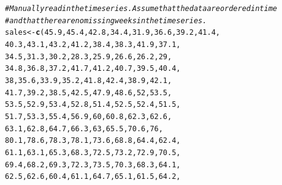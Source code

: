 \documentclass{article}\usepackage[]{graphicx}\usepackage[]{color}
\makeatletter
\newcommand{\hlnum}[1]{\textcolor[rgb]{0.686,0.059,0.569}{#1}}%
\newcommand{\hlcom}[1]{\textcolor[rgb]{0.678,0.584,0.686}{\textit{#1}}}%
\newcommand{\hlstd}[1]{\textcolor[rgb]{0.345,0.345,0.345}{#1}}%
\newcommand{\hlkwb}[1]{\textcolor[rgb]{0.69,0.353,0.396}{#1}}%
\newcommand{\hlkwd}[1]{\textcolor[rgb]{0.737,0.353,0.396}{\textbf{#1}}}%
\newenvironment{kframe}{%
 \def\at@end@of@kframe{}%
 \ifinner\ifhmode%
  \def\at@end@of@kframe{\end{minipage}}%
  \begin{minipage}{\columnwidth}%
 \fi\fi%
 \def\FrameCommand##1{\hskip\@totalleftmargin \hskip-\fboxsep
 \colorbox{shadecolor}{##1}\hskip-\fboxsep
     \hskip-\linewidth \hskip-\@totalleftmargin \hskip\columnwidth}%
 \MakeFramed {\advance\hsize-\width
   \@totalleftmargin\z@ \linewidth\hsize
   \@setminipage}}%
 {\par\unskip\endMakeFramed%
 \at@end@of@kframe}
\newenvironment{knitrout}{}{} %
\makeatother
\begin{document}
\begin{knitrout}
\begin{kframe}
\begin{alltt}
\hlcom{# Manually read in the time series. Assume that the data are ordered in time}
\hlcom{# and that there are no missing weeks in the time series. }
\hlstd{sales} \hlkwb{<-} \hlkwd{c}\hlstd{(}\hlnum{45.9}\hlstd{,}  \hlnum{45.4}\hlstd{,}  \hlnum{42.8}\hlstd{,}  \hlnum{34.4}\hlstd{,} \hlnum{31.9}\hlstd{,}  \hlnum{36.6}\hlstd{,}  \hlnum{39.2}\hlstd{,}  \hlnum{41.4}\hlstd{,}
           \hlnum{40.3}\hlstd{,}  \hlnum{43.1}\hlstd{,}  \hlnum{43.2}\hlstd{,}  \hlnum{41.2}\hlstd{,} \hlnum{38.4}\hlstd{,}  \hlnum{38.3}\hlstd{,}  \hlnum{41.9}\hlstd{,}  \hlnum{37.1}\hlstd{,}
           \hlnum{34.5}\hlstd{,}  \hlnum{31.3}\hlstd{,}  \hlnum{30.2}\hlstd{,}  \hlnum{28.3}\hlstd{,} \hlnum{25.9}\hlstd{,}  \hlnum{26.6}\hlstd{,}  \hlnum{26.2}\hlstd{,}  \hlnum{29}\hlstd{,}
           \hlnum{34.8}\hlstd{,}  \hlnum{36.8}\hlstd{,}  \hlnum{37.2}\hlstd{,}  \hlnum{41.7}\hlstd{,} \hlnum{41.2}\hlstd{,}  \hlnum{40.7}\hlstd{,}  \hlnum{39.5}\hlstd{,}  \hlnum{40.4}\hlstd{,}
           \hlnum{38}\hlstd{,}    \hlnum{35.6}\hlstd{,}  \hlnum{33.9}\hlstd{,}  \hlnum{35.2}\hlstd{,} \hlnum{41.8}\hlstd{,}  \hlnum{42.4}\hlstd{,}  \hlnum{38.9}\hlstd{,}  \hlnum{42.1}\hlstd{,}
           \hlnum{41.7}\hlstd{,}  \hlnum{39.2}\hlstd{,}  \hlnum{38.5}\hlstd{,}  \hlnum{42.5}\hlstd{,} \hlnum{47.9}\hlstd{,}  \hlnum{48.6}\hlstd{,}  \hlnum{52}\hlstd{,}    \hlnum{53.5}\hlstd{,}
           \hlnum{53.5}\hlstd{,}  \hlnum{52.9}\hlstd{,}  \hlnum{53.4}\hlstd{,}  \hlnum{52.8}\hlstd{,} \hlnum{51.4}\hlstd{,}  \hlnum{52.5}\hlstd{,}  \hlnum{52.4}\hlstd{,}  \hlnum{51.5}\hlstd{,}
           \hlnum{51.7}\hlstd{,}  \hlnum{53.3}\hlstd{,}  \hlnum{55.4}\hlstd{,}  \hlnum{56.9}\hlstd{,} \hlnum{60}\hlstd{,}    \hlnum{60.8}\hlstd{,}  \hlnum{62.3}\hlstd{,}  \hlnum{62.6}\hlstd{,}
           \hlnum{63.1}\hlstd{,}  \hlnum{62.8}\hlstd{,}  \hlnum{64.7}\hlstd{,}  \hlnum{66.3}\hlstd{,} \hlnum{63}\hlstd{,}    \hlnum{65.5}\hlstd{,}  \hlnum{70.6}\hlstd{,}  \hlnum{76}\hlstd{,}
           \hlnum{80.1}\hlstd{,}  \hlnum{78.6}\hlstd{,}  \hlnum{78.3}\hlstd{,}  \hlnum{78.1}\hlstd{,} \hlnum{73.6}\hlstd{,}  \hlnum{68.8}\hlstd{,}  \hlnum{64.4}\hlstd{,}  \hlnum{62.4}\hlstd{,}
           \hlnum{61.1}\hlstd{,}  \hlnum{63.1}\hlstd{,}  \hlnum{65.3}\hlstd{,}  \hlnum{68.3}\hlstd{,} \hlnum{72.5}\hlstd{,}  \hlnum{73.2}\hlstd{,}  \hlnum{72.9}\hlstd{,}  \hlnum{70.5}\hlstd{,}
           \hlnum{69.4}\hlstd{,}  \hlnum{68.2}\hlstd{,}  \hlnum{69.3}\hlstd{,}  \hlnum{72.3}\hlstd{,} \hlnum{73.5}\hlstd{,}  \hlnum{70.3}\hlstd{,}  \hlnum{68.3}\hlstd{,}  \hlnum{64.1}\hlstd{,}
           \hlnum{62.5}\hlstd{,}  \hlnum{62.6}\hlstd{,}  \hlnum{60.4}\hlstd{,}  \hlnum{61.1}\hlstd{,} \hlnum{64.7}\hlstd{,}  \hlnum{65.1}\hlstd{,}  \hlnum{61.5}\hlstd{,}  \hlnum{64.2}\hlstd{,}

\end{alltt}
\end{kframe}
\end{knitrout}
\end{document}
